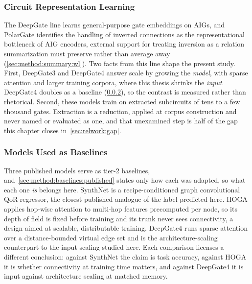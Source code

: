 \subsubsection{Circuit Representation Learning}
\label{sec:relwork:ml4eda:representation}
The DeepGate line \citep{li2022deepgate,shi2024deepgate3,deepgate4_2025} learns
general-purpose gate embeddings on AIGs, and PolarGate \citep{polargate2024} identifies
the handling of inverted connections as the representational bottleneck of AIG encoders,
external support for treating inversion as a relation summarization must preserve rather
than average away (\ref{sec:method:summary:wl}). Two facts from this line shape the
present study. First, DeepGate3 and DeepGate4 answer scale by growing the \emph{model},
with sparse attention and larger training corpora, where this thesis shrinks the
\emph{input}. DeepGate4 doubles as a baseline (\ref{sec:relwork:ml4eda:baselines}), so
the contrast is measured rather than rhetorical. Second, these models train on extracted
subcircuits of tens to a few thousand gates. Extraction is a reduction, applied at corpus
construction and never named or evaluated as one, and that unexamined step is half of the
gap this chapter closes in~\ref{sec:relwork:gap}.

\subsubsection{Models Used as Baselines}
\label{sec:relwork:ml4eda:baselines}
Three published models serve as tier-2 baselines,
and~\ref{sec:method:baselines:published} states only how each was adapted, so what each
one \emph{is} belongs here. SynthNet
\citep{chowdhury2021openabc} is a recipe-conditioned graph convolutional QoR regressor,
the closest published analogue of the label predicted here. HOGA \citep{deng2024hoga}
applies hop-wise attention to multi-hop features precomputed per node, so its depth of
field is fixed before training and its trunk never sees connectivity, a design aimed at
scalable, distributable training. DeepGate4 \citep{deepgate4_2025} runs sparse attention
over a distance-bounded virtual edge set and is the architecture-scaling counterpart to
the input scaling studied here. Each comparison licenses a different conclusion: against
SynthNet the claim is task accuracy, against HOGA it is whether connectivity at training
time matters, and against DeepGate4 it is input against architecture scaling at matched
memory.

